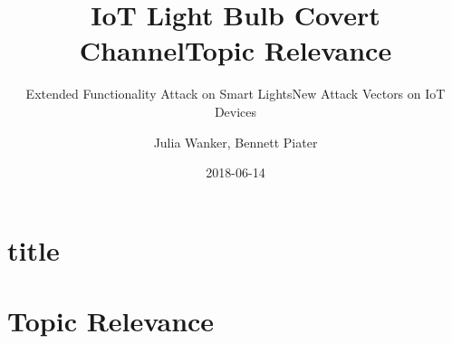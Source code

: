 \documentclass[11pt,t,usepdftitle=false,aspectratio=169]{beamer}
\title[IoT Light Bulb Attack]{IoT Light Bulb Covert Channel}
\subtitle{Extended Functionality Attack on Smart Lights}
\author[Julia Wanker \& Bennett Piater]{Julia Wanker, Bennett Piater}
\date{2018-06-14}
\begin{document}
\section{title}




\title{Topic Relevance}
\subtitle{New Attack Vectors on IoT Devices}
\section{Topic Relevance} %
\label{sec:relevance}
\end{document}
